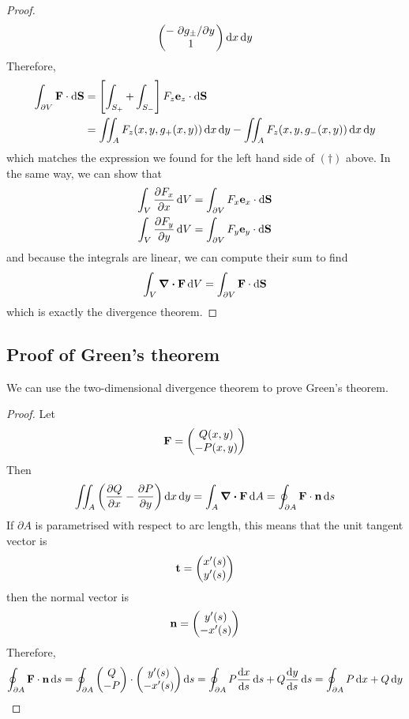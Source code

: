 \begin{proof}
\[\begin{pmatrix}
			-\pdv*{g_\pm}{y} \\
			1                \\
		\end{pmatrix} \dd{x}\dd{y}
	\]
	Therefore,
	\begin{align*}
		\int_{\partial V} \vb F \cdot \dd{\vb S} & = \left[ \int_{S_+} + \int_{S_-} \right] F_z \vb e_z \cdot \dd{\vb S}                   \\
		                                         & = \iint_A F_z(x, y, g_+(x, y)) \dd{x}\dd{y} - \iint_A F_z(x, y, g_-(x, y)) \dd{x}\dd{y}
	\end{align*}
	which matches the expression we found for the left hand side of \((\dagger)\) above.
	In the same way, we can show that
	\begin{align*}
		\int_V \pdv{F_x}{x} \dd{V} & = \int_{\partial V} F_x \vb e_x \cdot \dd{\vb S} \\
		\int_V \pdv{F_y}{y} \dd{V} & = \int_{\partial V} F_y \vb e_y \cdot \dd{\vb S} \\
	\end{align*}
	and because the integrals are linear, we can compute their sum to find
	\[
		\int_V \div{\vb F} \dd{V} = \int_{\partial V} \vb F \cdot \dd{\vb S}
	\]
	which is exactly the divergence theorem.
\end{proof}

\subsection{Proof of Green's theorem}
We can use the two-dimensional divergence theorem to prove Green's theorem.
\begin{proof}
	Let
	\[
		\vb F = \begin{pmatrix}
			Q(x, y) \\ -P(x, y)
		\end{pmatrix}
	\]
	Then
	\[
		\iint_A \left( \pdv{Q}{x} - \pdv{P}{y} \right) \dd{x}\dd{y} = \int_A \div{\vb F} \dd{A} = \oint_{\partial A} \vb F \cdot \vb n \dd{s}
	\]
	If \(\partial A\) is parametrised with respect to arc length, this means that the unit tangent vector is
	\[
		\vb t = \begin{pmatrix}
			x'(s) \\ y'(s)
		\end{pmatrix}
	\]
	then the normal vector is
	\[
		\vb n = \begin{pmatrix}
			y'(s) \\ -x'(s)
		\end{pmatrix}
	\]
	Therefore,
	\[
		\oint_{\partial A} \vb F \cdot \vb n \dd{s} = \oint_{\partial A} \begin{pmatrix}
			Q \\ -P
		\end{pmatrix} \cdot \begin{pmatrix}
			y'(s) \\ -x'(s)
		\end{pmatrix} \dd{s} = \oint_{\partial A} P \dv{x}{s} \dd{s} + Q \dv{y}{s} \dd{s} = \oint_{\partial A} P \dd{x} + Q \dd{y}
	\]
\end{proof}

